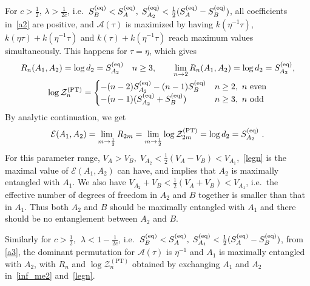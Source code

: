 \documentclass[a4paper,11pt]{article}
\newcommand\half{{\ensuremath{\frac{1}{2}}}}
\newcommand{\Zpt}{\sZ_n^{(\text{PT})}}
\newcommand{\be}{\begin{equation}}
\newcommand{\ee}{\end{equation}}
\newcommand\ha{{\half}}
\newcommand\sA{{\ensuremath{{\mathcal A}}}}
\newcommand\sE{{\ensuremath{{\mathcal E}}}}
\newcommand\sZ{{\mathcal Z}}
\begin{document}
\begin{enumerate}
For $c>\ha, \, \lambda>\frac{1}{2c}$, i.e.~$S_B^{\rm (eq)} < S_A^{(\rm eq)},\; S_{A_2}^{(\rm eq)} < \ha (S_A^{(\rm eq)} - S_B^{\rm (eq)})$, 
all coefficients in~\eqref{a2} are positive, and $\sA(\tau)$ is maximized by having $k(\eta^{-1}\tau)$, $k(\eta\tau)+ k(\eta^{-1}\tau)$ and 
$k(\tau) + k(\eta^{-1}\tau)$ reach maximum values simultaneously. This happens for $\tau = \eta$, which gives 
\be 
\begin{gathered} 
R_n(A_1, A_2) = \log d_2 = S_{A_2}^{(\rm eq)} %
\quad n\geq 3, \qquad 
\lim_{n\rightarrow 2} R_n(A_1, A_2) = \log d_2 = S_{A_2}^{(\rm eq)}%
, \\
\log \Zpt = \begin{cases} %
- (n-2) S_{A_2}^{(\rm eq)} - (n-1) S_B^{\rm (eq)} 
& n \geq 2,~ n \text{ even} \\
- (n-1) (S_{A_2}^{(\rm eq)} + S_B^{\rm (eq)})
& n \geq 3,~ n \text{ odd}
\end{cases} 
\label{inf_me2}
\end{gathered} 
\end{equation} 
By analytic continuation, we get 
\be \label{legn}
\sE(A_1, A_2) = \lim_{m\rightarrow \ha} R_{2m} = \lim_{m\rightarrow \ha}\log \sZ_{2m}^{\text{(PT)}} =\log d_2 = S_{A_2}^{(\rm eq)} \ .
\ee
For this parameter range, $V_A > V_B, \; V_{A_2} < \ha (V_{A} - V_B) < V_{A_1}$,~\eqref{legn} is the maximal 
value of $\sE (A_1, A_2)$ can have, and implies that $A_2$ is maximally entangled with $A_1$. We also have 
$V_{A_2} + V_B < \ha (V_A + V_B) < V_{A_1}$, i.e.~the effective number of degrees of freedom in $A_2$ and $B$ together is smaller than that in $A_1$. Thus both $A_2$ and $B$ should be maximally entangled with $A_1$ and there should be no entanglement between $A_2$ and $B$. 


Similarly for $c>\ha, ~~ \lambda<1-\frac{1}{2c}$, i.e.~$S_B^{\rm (eq)} < S_A^{(\rm eq)},\; S_{A_1}^{(\rm eq)} < \ha (S_A^{(\rm eq)} - S_B^{\rm (eq)})$, from \eqref{a3}, the dominant permutation for $\sA(\tau)$ is $\eta^{-1}$
and $A_1$ is maximally entangled with $A_2$, with $R_n$ and $\log \Zpt$ obtained by exchanging $A_1$ and $A_2$ in~\eqref{inf_me2} and~\eqref{legn}. 

\iffalse
\be 
\begin{gathered} 
R_n(A_1, A_2) = N_{A_1}s_0^A, \quad n\geq 3, \quad \quad
\lim_{n\rightarrow 2} R_n(A_1, A_2) = N_{A_1} s_0^A, \\
\log \Zpt =\begin{cases} S_0 ~\left(2 c \lambda +n c(1-\lambda)
+(1-c)-n\right), & n \geq 2,~ n \text{ even} \\
S_0 ~\left( c \lambda +n c(1-\lambda)
+(1-c)-n\right), & n \geq 3,~ n \text{ odd}
\end{cases} 
\label{inf_me1}
\end{gathered} 
\end{equation}
By analytic continuation, we get 
\be \label{neg_max_inf}
\sE(A_1, A_2) = \lim_{m\rightarrow \ha} R_{2m} = \lim_{m\rightarrow \ha}\log\sZ_{2m}^{\text{(PT)}} = N_{A_1}~s_0^A 
\ee
\fi


\end{enumerate}
\end{document}
